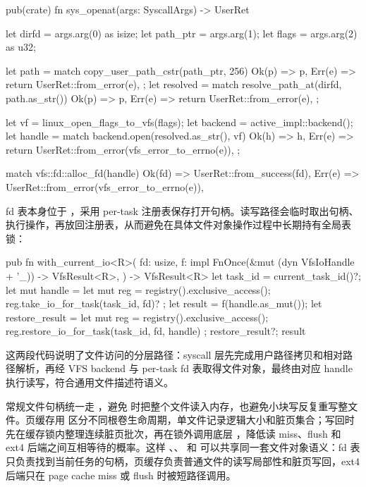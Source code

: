 \begin{rustcode}
pub(crate) fn sys_openat(args: SyscallArgs) -> UserRet {
    let dirfd = args.arg(0) as isize;
    let path_ptr = args.arg(1);
    let flags = args.arg(2) as u32;

    let path = match copy_user_path_cstr(path_ptr, 256) {
        Ok(p) => p,
        Err(e) => return UserRet::from_error(e),
    };
    let resolved = match resolve_path_at(dirfd, path.as_str()) {
        Ok(p) => p,
        Err(e) => return UserRet::from_error(e),
    };

    let vf = linux_open_flags_to_vfs(flags);
    let backend = active_impl::backend();
    let handle = match backend.open(resolved.as_str(), vf) {
        Ok(h) => h,
        Err(e) => return UserRet::from_error(vfs_error_to_errno(e)),
    };

    match vfs::fd::alloc_fd(handle) {
        Ok(fd) => UserRet::from_success(fd),
        Err(e) => UserRet::from_error(vfs_error_to_errno(e)),
    }
}
\end{rustcode}

fd 表本身位于 ，采用 per-task 注册表保存打开句柄。读写路径会临时取出句柄、执行操作，再放回注册表，从而避免在具体文件对象操作过程中长期持有全局表锁：

\begin{rustcode}
pub fn with_current_io<R>(
    fd: usize,
    f: impl FnOnce(&mut (dyn VfsIoHandle + '_)) -> VfsResult<R>,
) -> VfsResult<R> {
    let task_id = current_task_id()?;
    let mut handle = {
        let mut reg = registry().exclusive_access();
        reg.take_io_for_task(task_id, fd)?
    };
    let result = f(handle.as_mut());
    let restore_result = {
        let mut reg = registry().exclusive_access();
        reg.restore_io_for_task(task_id, fd, handle)
    };
    restore_result?;
    result
}
\end{rustcode}

这两段代码说明了文件访问的分层路径：syscall 层先完成用户路径拷贝和相对路径解析，再经 VFS backend 与 per-task fd 表取得文件对象，最终由对应 handle 执行读写，符合通用文件描述符语义。

常规文件句柄统一走 ，避免  时把整个文件读入内存，也避免小块写反复重写整文件。页缓存用  区分不同根卷生命周期，单文件记录逻辑大小和脏页集合；写回时先在缓存锁内整理连续脏页批次，再在锁外调用底层 ，降低读 miss、flush 和 ext4 后端之间互相等待的概率。这样 、、 和  可以共享同一套文件对象语义：fd 表只负责找到当前任务的句柄，页缓存负责普通文件的读写局部性和脏页写回，ext4 后端只在 page cache miss 或 flush 时被短路径调用。

